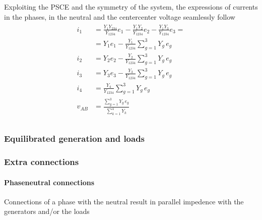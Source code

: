 \documentclass[letterpaper,10pt,english]{jupyterBook}
\begin{document}
\sphinxAtStartPar
{} Exploiting the PSCE and the symmetry of the system, the expressions of currents in the phases, in the neutral and the center\sphinxhyphen{}center voltage seamlessly follow
\begin{equation*}
\begin{split}\begin{aligned}
  i_1    & = \frac{Y_1 Y_{234}}{Y_{1234}} e_1 - \frac{Y_1 Y_2}{Y_{1234}} e_2 - \frac{Y_1 Y_3}{Y_{1234}} e_3 = \\
         & = Y_1 e_1 - \frac{Y_1}{Y_{1234}} \sum_{g=1}^{3} Y_g \, e_g \\
  i_2    & = Y_2 e_2 - \frac{Y_2}{Y_{1234}} \sum_{g=1}^{3} Y_g \, e_g \\
  i_3    & = Y_3 e_3 - \frac{Y_3}{Y_{1234}} \sum_{g=1}^{3} Y_g \, e_g \\
  i_4    & = \frac{Y_4}{Y_{1234}} \sum_{g=1}^{3} Y_g \, e_g \\
  v_{AB} & =  \frac{\sum_{g=1}^{3} Y_g \, e_g}{\sum_{k=1}^4 Y_k} \\
\end{aligned}\end{split}
\end{equation*}

\subsubsection{Equilibrated generation and loads}
\label{\detokenize{ch/electrical-engineering-three-phase:equilibrated-generation-and-loads}}

\subsubsection{Extra connections}
\label{\detokenize{ch/electrical-engineering-three-phase:extra-connections}}

\paragraph{Phase\sphinxhyphen{}neutral connections}
\label{\detokenize{ch/electrical-engineering-three-phase:phase-neutral-connections}}
\sphinxAtStartPar
Connections of a phase with the neutral result in parallel impedence with the generators and/or the loads

\begin{figure}[htbp]
\centering

\noindent{}
\end{figure}
\end{document}
